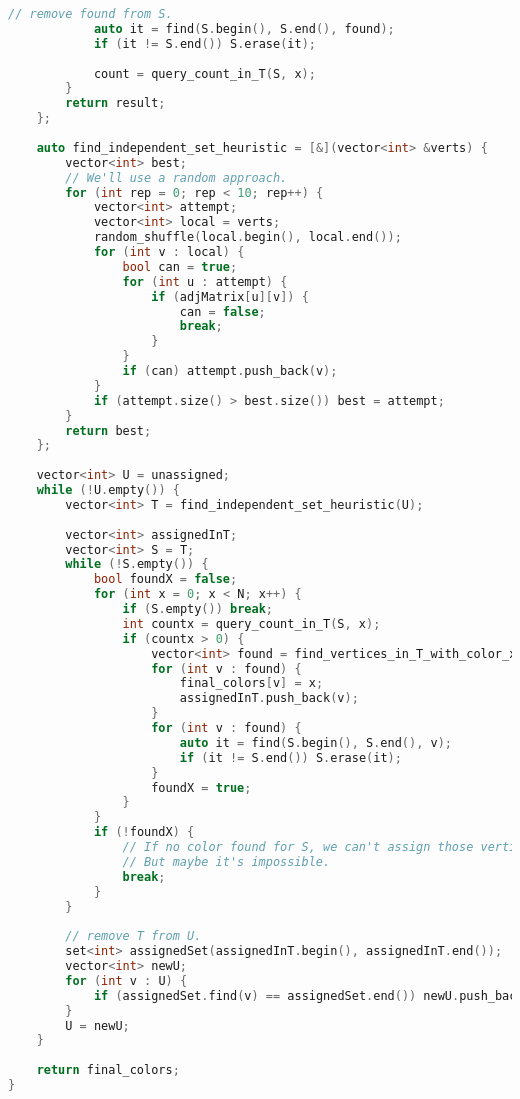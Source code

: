 \begin{lstlisting}[language=C++]
            // remove found from S.
            auto it = find(S.begin(), S.end(), found);
            if (it != S.end()) S.erase(it);
 
            count = query_count_in_T(S, x);
        }
        return result;
    };
 
    auto find_independent_set_heuristic = [&](vector<int> &verts) {
        vector<int> best;
        // We'll use a random approach.
        for (int rep = 0; rep < 10; rep++) {
            vector<int> attempt;
            vector<int> local = verts;
            random_shuffle(local.begin(), local.end());
            for (int v : local) {
                bool can = true;
                for (int u : attempt) {
                    if (adjMatrix[u][v]) {
                        can = false;
                        break;
                    }
                }
                if (can) attempt.push_back(v);
            }
            if (attempt.size() > best.size()) best = attempt;
        }
        return best;
    };
 
    vector<int> U = unassigned;
    while (!U.empty()) {
        vector<int> T = find_independent_set_heuristic(U);
 
        vector<int> assignedInT;
        vector<int> S = T;
        while (!S.empty()) {
            bool foundX = false;
            for (int x = 0; x < N; x++) {
                if (S.empty()) break;
                int countx = query_count_in_T(S, x);
                if (countx > 0) {
                    vector<int> found = find_vertices_in_T_with_color_x(S, x);
                    for (int v : found) {
                        final_colors[v] = x;
                        assignedInT.push_back(v);
                    }
                    for (int v : found) {
                        auto it = find(S.begin(), S.end(), v);
                        if (it != S.end()) S.erase(it);
                    }
                    foundX = true;
                }
            }
            if (!foundX) {
                // If no color found for S, we can't assign those vertices.
                // But maybe it's impossible.
                break;
            }
        }
 
        // remove T from U.
        set<int> assignedSet(assignedInT.begin(), assignedInT.end());
        vector<int> newU;
        for (int v : U) {
            if (assignedSet.find(v) == assignedSet.end()) newU.push_back(v);
        }
        U = newU;
    }
 
    return final_colors;
}
\end{lstlisting}
